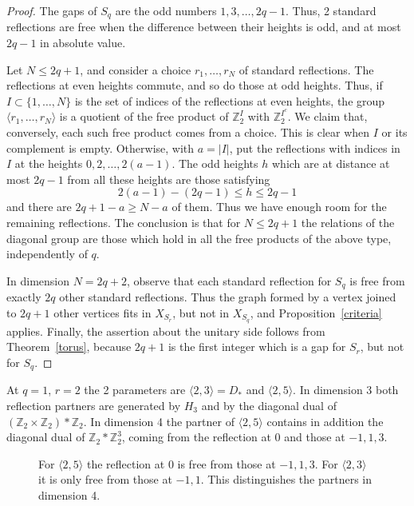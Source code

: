 \documentclass[11pt,a4paper]{article}
\begin{document}
\begin{proof}
The gaps of $S_q$ are the odd numbers $1,3,\ldots,2q-1$. Thus, 2 standard reflections are free when the difference between their heights is odd, and at most $2q-1$ in absolute value.

Let $N\leq2q+1$, and consider a choice $r_1,\ldots,r_N$ of standard reflections. The reflections at even heights commute, and so do those at odd heights. Thus, if $I\subset\{1,\ldots,N\}$ is the set of indices of the reflections at even heights, the group $\langle r_1,\ldots,r_N\rangle$ is a quotient of the free product of $\mathbb Z_2^I$ with $\mathbb Z_2^{I^c}$. We claim that, conversely, each such free product comes from a choice. This is clear when $I$ or its complement is empty. Otherwise, with $a=|I|$, put the reflections with indices in $I$ at the heights $0,2,\ldots,2(a-1)$. The odd heights $h$ which are at distance at most $2q-1$ from all these heights are those satisfying
\[
 2(a-1)-(2q-1)\leq h\leq2q-1
\]
and there are $2q+1-a\geq N-a$ of them. Thus we have enough room for the remaining reflections. The conclusion is that for $N\leq2q+1$ the relations of the diagonal group are those which hold in all the free products of the above type, independently of $q$.

In dimension $N=2q+2$, observe that each standard reflection for $S_q$ is free from exactly $2q$ other standard reflections. Thus the graph formed by a vertex joined to $2q+1$ other vertices fits in $X_{S_r}$, but not in $X_{S_q}$, and Proposition~\ref{criteria} applies. Finally, the assertion about the unitary side follows from Theorem~\ref{torus}, because $2q+1$ is the first integer which is a gap for $S_r$, but not for $S_q$.
\end{proof}

At $q=1$, $r=2$ the 2 parameters are $\langle2,3\rangle=D_*$ and $\langle2,5\rangle$. In dimension 3 both reflection partners are generated by $H_3$ and by the diagonal dual of $(\mathbb Z_2\times\mathbb Z_2)*\mathbb Z_2$. In dimension 4 the partner of $\langle2,5\rangle$ contains in addition the diagonal dual of $\mathbb Z_2*\mathbb Z_2^3$, coming from the reflection at $0$ and those at $-1,1,3$.

\begin{figure}[H]\centering
{}
\caption{For $\langle2,5\rangle$ the reflection at $0$ is free from those at $-1,1,3$. For $\langle2,3\rangle$ it is only free from those at $-1,1$. This distinguishes the partners in dimension 4.}
\label{four-star}
\end{figure}
\end{document}
